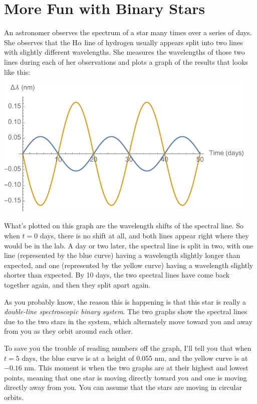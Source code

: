 \section{More Fun with Binary Stars}

\makelabheader

\bigskip

An astronomer observes the spectrum of a star many times over a series of days.
She observes that the H$\alpha$ line of hydrogen usually appears split
into two lines with slightly different wavelengths. She measures
the wavelengths of those two lines during each of her observations
and plots a graph of the results that looks like this:

\centerline{\includegraphics[width=5in]{binarycalcs/binary1.pdf}}

What's plotted on this graph are the wavelength shifts of the spectral line.
So when $t=0$ days, there is no shift at all, and both lines appear right
where they would be in the lab. A day or two later, the spectral line is split
in two, with one line (represented by the blue curve) having a wavelength slightly longer than expected, and one (represented by the yellow curve)
having a wavelength slightly shorter than expected. By 10 days, the two
spectral lines have come back together again, and then they split apart again.

As you probably know, the reason this is happening is that this star
is really a \textit{double-line spectroscopic binary system}. The two graphs
show the spectral lines due to the two stars in the system, which alternately
move toward you and away from you as they orbit around each other.

To save you the trouble of reading numbers off the graph, I'll
tell you that when $t=5$ days, the blue curve is at a height of 0.055 nm,
and the yellow curve is at $-0.16$ nm. This moment is when the two graphs
are at their highest and lowest points, meaning that one star is
moving directly toward you and one is moving directly away from you.
You can assume that the stars are moving in circular orbits.


